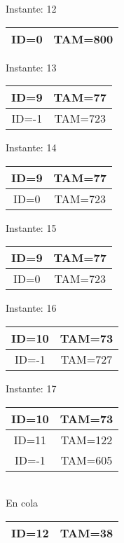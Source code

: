 \documentclass[10pt,a4paper]{article}
\begin{document}
\begin{center}

Instante: 12

\begin{tabular}{|c|c|}
\hline
ID=0 & TAM=800 \\ \hline
\end{tabular}
\end{center}\pagebreak
\begin{center}

Instante: 13

\begin{tabular}{|c|c|}
\hline
ID=9 & TAM=77 \\ \hline
ID=-1 & TAM=723 \\ \hline
\end{tabular}
\end{center}\pagebreak
\begin{center}

Instante: 14

\begin{tabular}{|c|c|}
\hline
ID=9 & TAM=77 \\ \hline
ID=0 & TAM=723 \\ \hline
\end{tabular}
\end{center}\pagebreak
\begin{center}

Instante: 15

\begin{tabular}{|c|c|}
\hline
ID=9 & TAM=77 \\ \hline
ID=0 & TAM=723 \\ \hline
\end{tabular}
\end{center}\pagebreak
\begin{center}

Instante: 16

\begin{tabular}{|c|c|}
\hline
ID=10 & TAM=73 \\ \hline
ID=-1 & TAM=727 \\ \hline
\end{tabular}
\end{center}\pagebreak
\begin{center}

Instante: 17

\begin{tabular}{|c|c|}
\hline
ID=10 & TAM=73 \\ \hline
ID=11 & TAM=122 \\ \hline
ID=-1 & TAM=605 \\ \hline
\end{tabular}
\\
\hfill \break
\hfill \break
\hfill \break
En cola
\\
\begin{tabular}{|c|c|}
\hline
ID=12 & TAM=38 \\ \hline
\end{tabular}
\end{center}
\end{document}
